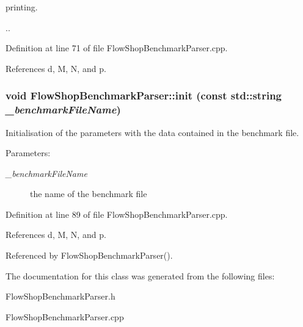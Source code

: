 printing. 

.. 

Definition at line 71 of file Flow\-Shop\-Benchmark\-Parser.cpp.

References d, M, N, and p.
\subsubsection{\setlength{\rightskip}{0pt plus 5cm}void Flow\-Shop\-Benchmark\-Parser::init (const std::string {\em \_\-benchmark\-File\-Name})\hspace{0.3cm}{\tt  [private]}}\label{classFlowShopBenchmarkParser_4e6de6a0ec2859e1a2fb758fb06dc915}


Initialisation of the parameters with the data contained in the benchmark file. 

\begin{Desc}
\item[Parameters:]
\begin{description}
\item[{\em \_\-benchmark\-File\-Name}]the name of the benchmark file \end{description}
\end{Desc}


Definition at line 89 of file Flow\-Shop\-Benchmark\-Parser.cpp.

References d, M, N, and p.

Referenced by Flow\-Shop\-Benchmark\-Parser().

The documentation for this class was generated from the following files:\begin{CompactItemize}
\item 
Flow\-Shop\-Benchmark\-Parser.h\item 
Flow\-Shop\-Benchmark\-Parser.cpp\end{CompactItemize}
